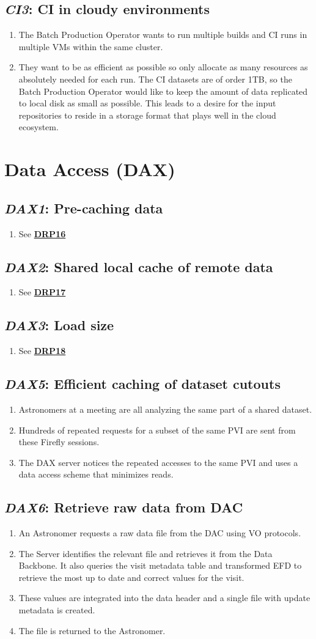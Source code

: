 \documentclass[DM,toc,lsstdraft]{lsstdoc}
\newcommand{\usecase}[3]{%
\subsection{\emph{#1}: #2}
\label{use:#1}
\begin{enumerate}[label=\alph*.]
#3
\end{enumerate}
}
\newcommand{\useref}[1]{\hyperref[use:#1]{\textcolor{lsstblue}{\textbf{#1}}}}
\begin{document}
\usecase{CI3}{CI in cloudy environments}{%

\item
The Batch Production Operator wants to run multiple builds and CI runs in multiple VMs within the same cluster.

\item
They want to be as efficient as possible so only allocate as many resources as absolutely needed for each run.
The CI datasets are of order 1TB, so the Batch Production Operator would like to keep the amount of data replicated to local disk as small as possible.
This leads to a desire for the input repositories to reside in a storage format that plays well in the cloud ecosystem.

}

\section{Data Access (DAX)}

\usecase{DAX1}{Pre-caching data}{%

\item
See \useref{DRP16}

}

\usecase{DAX2}{Shared local cache of remote data}{%

\item
See \useref{DRP17}

}

\usecase{DAX3}{Load size}{%

\item
See \useref{DRP18}

}

\usecase{DAX5}{Efficient caching of dataset cutouts}{%

\item
Astronomers at a meeting are all analyzing the same part of a shared dataset.

\item
Hundreds of repeated requests for a subset of the same PVI are sent from these Firefly sessions.

\item
The DAX server notices the repeated accesses to the same PVI and uses a data access scheme that minimizes reads.

}

\usecase{DAX6}{Retrieve raw data from DAC}{%

\item
An Astronomer requests a raw data file from the DAC using VO protocols.

\item
The Server identifies the relevant file and retrieves it from the Data Backbone.
It also queries the visit metadata table and transformed EFD to retrieve the most up to date and correct values for the visit.

\item
These values are integrated into the data header and a single file with update metadata is created.

\item
The file is returned to the Astronomer.

}
\end{document}
